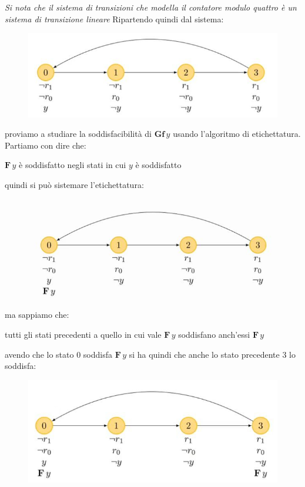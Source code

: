 \documentclass[a4paper,12pt, oneside]{book}
\begin{document}
\textit{Si nota che il sistema di transizioni che modella il contatore modulo
  quattro è un sistema di transizione lineare}
\newpage
Ripartendo quindi dal sistema:
\begin{figure}[H]
  \centering
  \includegraphics[scale = 0.45]{img/4c2.jpg} 
\end{figure}
proviamo a studiare la soddisfacibilità di $\mathbf{Gf}\,y$ usando l'algoritmo
di etichettatura.\\
Partiamo con dire che:
\begin{center}
  $\mathbf{F}\,y$ è soddisfatto negli stati in cui $y$ è soddisfatto
\end{center}
quindi si può sistemare l'etichettatura:
\begin{figure}[H]
  \centering
  \includegraphics[scale = 0.45]{img/4c3.jpg} 
\end{figure}
ma sappiamo che:
\begin{center}
  tutti gli stati precedenti a quello in cui vale $\mathbf{F}\,y$ soddisfano
  anch'essi $\mathbf{F}\,y$
\end{center}
avendo che lo stato 0 soddisfa $\mathbf{F}\,y$ si ha quindi che anche lo stato
precedente 3 lo soddisfa:
\begin{figure}[H]
  \centering
  \includegraphics[scale = 2]{img/4c4.jpg} 
\end{figure}
\end{document}
